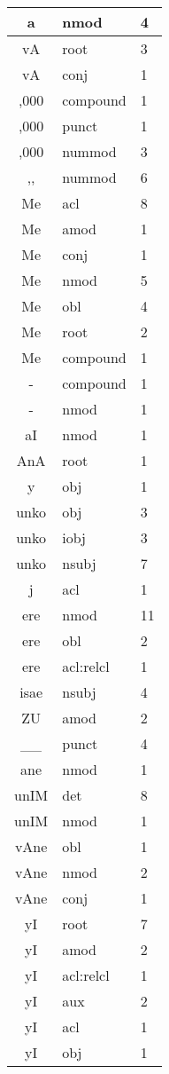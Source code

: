 \documentclass[a4 paper]{article}
\begin{document}
\begin{longtable}{cp{}p{}}
a & nmod & 4\\ \midrule 
vA & root & 3\\ \midrule vA & conj & 1\\ \midrule 
,000 & compound & 1\\ \midrule ,000 & punct & 1\\ \midrule ,000 & nummod & 3\\ \midrule 
,, & nummod & 6\\ \midrule 
Me & acl & 8\\ \midrule Me & amod & 1\\ \midrule Me & conj & 1\\ \midrule Me & nmod & 5\\ \midrule Me & obl & 4\\ \midrule Me & root & 2\\ \midrule Me & compound & 1\\ \midrule 
- & compound & 1\\ \midrule - & nmod & 1\\ \midrule 
aI & nmod & 1\\ \midrule 
AnA & root & 1\\ \midrule 
y & obj & 1\\ \midrule 
unko & obj & 3\\ \midrule unko & iobj & 3\\ \midrule unko & nsubj & 7\\ \midrule 
j & acl & 1\\ \midrule 
ere & nmod & 11\\ \midrule ere & obl & 2\\ \midrule ere & acl:relcl & 1\\ \midrule 
isae & nsubj & 4\\ \midrule 
ZU & amod & 2\\ \midrule 
\_\_ & punct & 4\\ \midrule 
ane & nmod & 1\\ \midrule 
unIM & det & 8\\ \midrule unIM & nmod & 1\\ \midrule 
vAne & obl & 1\\ \midrule vAne & nmod & 2\\ \midrule vAne & conj & 1\\ \midrule 
yI & root & 7\\ \midrule yI & amod & 2\\ \midrule yI & acl:relcl & 1\\ \midrule yI & aux & 2\\ \midrule yI & acl & 1\\ \midrule yI & obj & 1\\ \midrule 

\end{longtable}
\end{document}
